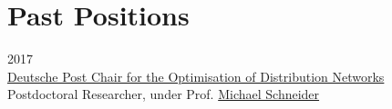\section*{Past Positions}

\begin{paracol}{2}
  2017
\switchcolumn
  \\
  \href{http://www.dpor.rwth-aachen.de/}{Deutsche Post Chair for the Optimisation of Distribution Networks}\\
  Postdoctoral Researcher, under Prof. \href{http://www.dpo.rwth-aachen.de/cms/DPO/Der-Lehrstuhl/Team/Lehrstuhlleitung/~nwkh/Michael-Schneider/lidx/1/}{Michael Schneider}
\end{paracol}